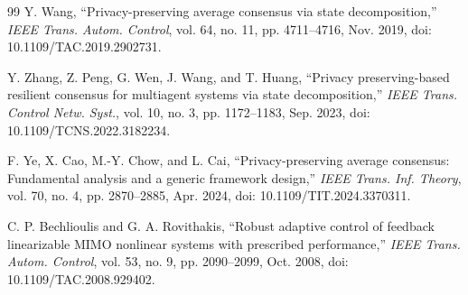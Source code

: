 \documentclass[journal]{IEEEtran}
\begin{document}
\begin{thebibliography}{99}
Y. Wang, ``Privacy-preserving average consensus via state decomposition,''
\emph{IEEE Trans. Autom. Control}, vol. 64, no. 11, pp. 4711--4716,
Nov. 2019, doi: 10.1109/TAC.2019.2902731.

Y. Zhang, Z. Peng, G. Wen, J. Wang, and T. Huang, ``Privacy preserving-based
resilient consensus for multiagent systems via state decomposition,''
\emph{IEEE Trans. Control Netw. Syst.}, vol. 10, no. 3, pp. 1172--1183,
Sep. 2023, doi: 10.1109/TCNS.2022.3182234.

F. Ye, X. Cao, M.-Y. Chow, and L. Cai, ``Privacy-preserving average consensus:
Fundamental analysis and a generic framework design,'' \emph{IEEE Trans. Inf.
Theory}, vol. 70, no. 4, pp. 2870--2885, Apr. 2024,
doi: 10.1109/TIT.2024.3370311.

C. P. Bechlioulis and G. A. Rovithakis, ``Robust adaptive control of feedback
linearizable MIMO nonlinear systems with prescribed performance,''
\emph{IEEE Trans. Autom. Control}, vol. 53, no. 9, pp. 2090--2099,
Oct. 2008, doi: 10.1109/TAC.2008.929402.

\end{thebibliography}
\end{document}
